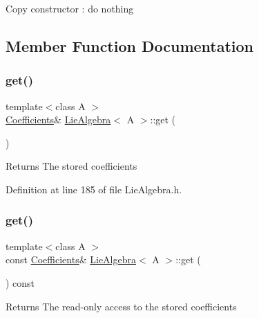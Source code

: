 Copy constructor \+: do nothing 

\subsection{Member Function Documentation}
\hypertarget{class_lie_algebra_a5d64201eddce6b2124890c26a684fc8f}{}\label{class_lie_algebra_a5d64201eddce6b2124890c26a684fc8f} 
\subsubsection{\texorpdfstring{get()}{get()}\hspace{0.1cm}{\footnotesize\ttfamily [1/2]}}
{\footnotesize\ttfamily template$<$class A $>$ \\
\hyperlink{class_lie_algebra_a366fde92cd31cf93be87fe82952c8ebb}{Coefficients}\& \hyperlink{class_lie_algebra}{Lie\+Algebra}$<$ A $>$\+::get (\begin{DoxyParamCaption}{ }\end{DoxyParamCaption})\hspace{0.3cm}{\ttfamily [inline]}}

\begin{DoxyReturn}{Returns}
The stored coefficients 
\end{DoxyReturn}


Definition at line 185 of file Lie\+Algebra.\+h.

\hypertarget{class_lie_algebra_aa90c4e53102c2376bf24af1cb4f0112c}{}\label{class_lie_algebra_aa90c4e53102c2376bf24af1cb4f0112c} 
\subsubsection{\texorpdfstring{get()}{get()}\hspace{0.1cm}{\footnotesize\ttfamily [2/2]}}
{\footnotesize\ttfamily template$<$class A $>$ \\
const \hyperlink{class_lie_algebra_a366fde92cd31cf93be87fe82952c8ebb}{Coefficients}\& \hyperlink{class_lie_algebra}{Lie\+Algebra}$<$ A $>$\+::get (\begin{DoxyParamCaption}{ }\end{DoxyParamCaption}) const\hspace{0.3cm}{\ttfamily [inline]}}

\begin{DoxyReturn}{Returns}
The read-\/only access to the stored coefficients 
\end{DoxyReturn}


